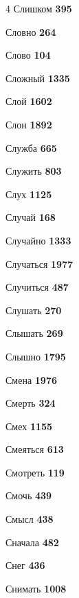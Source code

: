 \begin{multicols}{4}
\noindent Слишком \dotfill \textbf{\color{secondary} 395}\par
\noindent Словно \dotfill \textbf{\color{secondary} 264}\par
\noindent Слово \dotfill \textbf{\color{secondary} 104}\par
\noindent Сложный \dotfill \textbf{\color{secondary} 1335}\par
\noindent Слой \dotfill \textbf{\color{secondary} 1602}\par
\noindent Слон \dotfill \textbf{\color{secondary} 1892}\par
\noindent Служба \dotfill \textbf{\color{secondary} 665}\par
\noindent Служить \dotfill \textbf{\color{secondary} 803}\par
\noindent Слух \dotfill \textbf{\color{secondary} 1125}\par
\noindent Случай \dotfill \textbf{\color{secondary} 168}\par
\noindent Случайно \dotfill \textbf{\color{secondary} 1333}\par
\noindent Случаться \dotfill \textbf{\color{secondary} 1977}\par
\noindent Случиться \dotfill \textbf{\color{secondary} 487}\par
\noindent Слушать \dotfill \textbf{\color{secondary} 270}\par
\noindent Слышать \dotfill \textbf{\color{secondary} 269}\par
\noindent Слышно \dotfill \textbf{\color{secondary} 1795}\par
\noindent Смена \dotfill \textbf{\color{secondary} 1976}\par
\noindent Смерть \dotfill \textbf{\color{secondary} 324}\par
\noindent Смех \dotfill \textbf{\color{secondary} 1155}\par
\noindent Смеяться \dotfill \textbf{\color{secondary} 613}\par
\noindent Смотреть \dotfill \textbf{\color{secondary} 119}\par
\noindent Смочь \dotfill \textbf{\color{secondary} 439}\par
\noindent Смысл \dotfill \textbf{\color{secondary} 438}\par
\noindent Сначала \dotfill \textbf{\color{secondary} 482}\par
\noindent Снег \dotfill \textbf{\color{secondary} 436}\par
\noindent Снимать \dotfill \textbf{\color{secondary} 1008}\par

\end{multicols}
